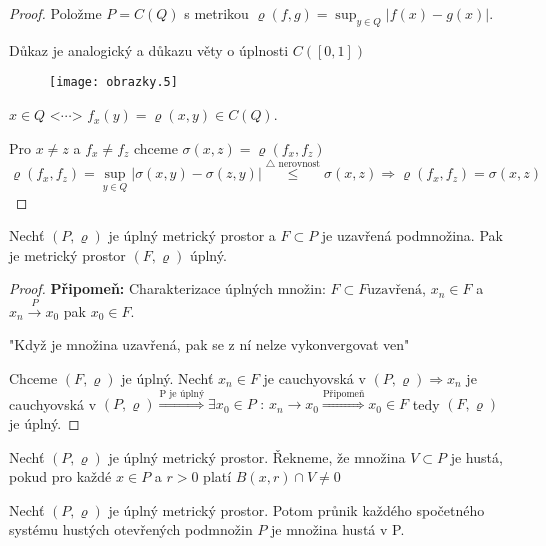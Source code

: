 \begin{proof}
Položme $P = C(Q)$ s metrikou $\varrho (f,g) = \sup_{y \in Q} | f(x)-g(x) |$. 

\begin{poznamka} 
Důkaz je analogický a důkazu věty o úplnosti $C([0,1])$
\end{poznamka}

\begin{figure}[!hp] \begin{center}
\texttt{[image: obrazky.5]}
\end{center} \end{figure}

$x \in Q \textrm{ <$\cdots$> } f_x(y) = \varrho(x,y) \in C(Q)$. 

Pro $x \neq z$ a $f_x \neq f_z$ chceme $\sigma (x,z) = \varrho (f_x, f_z)$
$$\varrho (f_x, f_z) = \sup_{y \in Q} | \sigma (x,y) - \sigma (z,y) | \overset{\textrm{$\triangle$ nerovnost}}{\leq} \sigma (x,z) \Rightarrow \varrho (f_x, f_z) = \sigma(x,z)$$ 
\end{proof}


\begin{vetal}
Nechť $(P, \varrho)$ je úplný metrický prostor a $F \subset P$ je uzavřená podmnožina. Pak je metrický prostor $(F, \varrho)$ úplný.
\end{vetal}

\begin{proof}
\textbf{Připomeň: } Charakterizace úplných množin: $F \subset F \textrm{uzavřená}$, $x_n \in F$ a $x_n \overset{P}{\to} x_0$ pak $x_0 \in F$. 

"Když je množina uzavřená, pak se z ní nelze vykonvergovat ven"

Chceme $(F, \varrho)$ je úplný. Nechť $x_n \in F$ je cauchyovská v $(P, \varrho)\Rightarrow x_n$ je cauchyovská v $(P, \varrho) \overset{\textrm{P je úplný}}{\Rightarrow} \exists x_0 \in P \textrm{ : } x_n \to x_0 \overset{\textrm{Připomeň}}{\Rightarrow} x_0 \in F$ tedy $(F, \varrho)$ je úplný.
\end{proof}

\begin{definice}
Nechť $(P, \varrho)$ je úplný metrický prostor. Řekneme, že množina $V \subset P$ je hustá, pokud pro každé $x \in P$ a $r > 0$ platí $B(x,r) \cap V \neq 0$
\end{definice}

\begin{vetat}[Baire]
\label{Baire}
Nechť $(P, \varrho)$ je úplný metrický prostor. Potom průnik každého spočetného systému hustých otevřených podmnožin $P$ je množina hustá v P.
\end{vetat}


